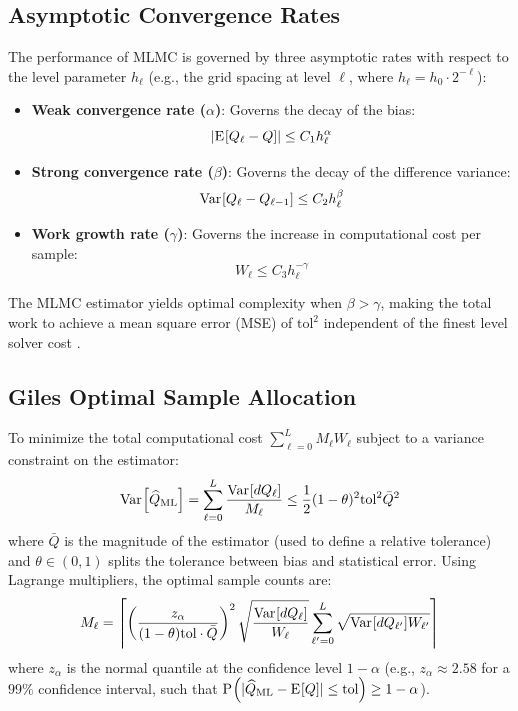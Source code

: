 \documentclass[preprint,12pt]{elsarticle}
\newcommand{\qoi}{Q}
\newcommand{\maxl}{L}
\newcommand{\weakrate}{\alpha}
\newcommand{\strongrate}{\beta}
\newcommand{\workrate}{\gamma}
\newcommand{\E}[1]{{\ensuremath{\mathrm{E}}\mspace{-2mu}\left[#1\right]}}
\newcommand{\V}[1]{{\ensuremath{\mathrm{Var}}\mspace{-2mu}\left[#1\right]}}
\newcommand{\Prob}[1]{{\ensuremath{\mathrm{P}}\mspace{-2mu}\left(#1\right)}}
\begin{document}
\subsection{Asymptotic Convergence Rates}
The performance of MLMC is governed by three asymptotic rates with respect to the level parameter $h_\ell$ (e.g., the grid spacing at level $\ell$, where $h_\ell = h_0 \cdot 2^{-\ell}$):
\begin{itemize}
    \item \textbf{Weak convergence rate ($\weakrate$)}: Governs the decay of the bias:
    \begin{equation}
    |\E{\qoi_\ell - \qoi}| \le C_1 h_\ell^{\weakrate}
    \end{equation}
    \item \textbf{Strong convergence rate ($\strongrate$)}: Governs the decay of the difference variance:
    \begin{equation}
    \V{\qoi_\ell - \qoi_{\ell-1}} \le C_2 h_\ell^{\strongrate}
    \end{equation}
    \item \textbf{Work growth rate ($\workrate$)}: Governs the increase in computational cost per sample:
    \begin{equation}
    W_\ell \le C_3 h_\ell^{-\workrate}
    \end{equation}
\end{itemize}
The MLMC estimator yields optimal complexity when $\strongrate > \workrate$, making the total work to achieve a mean square error (MSE) of $\text{tol}^2$ independent of the finest level solver cost \citep{giles2008multilevel}.

\subsection{Giles Optimal Sample Allocation}
To minimize the total computational cost $\sum_{\ell=0}^{\maxl} M_\ell W_\ell$ subject to a variance constraint on the estimator:
\begin{equation}
\V{\widehat{\qoi}_{\text{ML}}} = \sum_{\ell=0}^{\maxl} \frac{\V{d\qoi_\ell}}{M_\ell} \le \frac{1}{2} (1 - \theta)^2 \text{tol}^2 \bar{\qoi}^2
\end{equation}
where $\bar{\qoi}$ is the magnitude of the estimator (used to define a relative tolerance) and $\theta \in (0,1)$ splits the tolerance between bias and statistical error. Using Lagrange multipliers, the optimal sample counts are:
\begin{equation}
\label{eq:giles_allocation}
M_\ell = \left\lceil \left( \frac{z_\alpha}{(1 - \theta) \text{tol} \cdot \bar{\qoi}} \right)^2 \sqrt{\frac{\V{d\qoi_\ell}}{W_\ell}} \sum_{\ell'=0}^{\maxl} \sqrt{\V{d\qoi_{\ell'}} W_{\ell'}} \right\rceil
\end{equation}
where $z_\alpha$ is the normal quantile at the confidence level $1-\alpha$ (e.g., $z_\alpha \approx 2.58$ for a $99\%$ confidence interval, such that $\Prob{|\widehat{\qoi}_{\text{ML}} - \E{\qoi}| \le \text{tol}} \ge 1-\alpha$).
\end{document}
